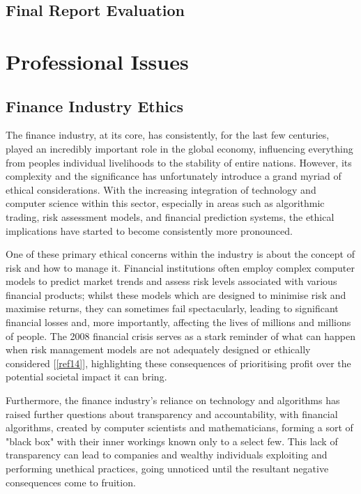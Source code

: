\documentclass{article}
\begin{document}
\subsection{Final Report Evaluation}



\section{Professional Issues}

\subsection{Finance Industry Ethics}

The finance industry, at its core, has consistently, for the last few centuries, played an incredibly important role in the global economy, influencing everything from peoples individual livelihoods to the stability of entire nations. However, its complexity and the significance has unfortunately introduce a grand myriad of ethical considerations. With the increasing integration of technology and computer science within this sector, especially in areas such as algorithmic trading, risk assessment models, and financial prediction systems, the ethical implications have started to become consistently more pronounced.\\\vspace{0.3cm}

One of these primary ethical concerns within the industry is about the concept of risk and how to manage it. Financial institutions often employ complex computer models to predict market trends and assess risk levels associated with various financial products; whilst these models which are designed to minimise risk and maximise returns, they can sometimes fail spectacularly, leading to significant financial losses and, more importantly, affecting the lives of millions and millions of people. The 2008 financial crisis serves as a stark reminder of what can happen when risk management models are not adequately designed or ethically considered [\ref{ref14}], highlighting these consequences of prioritising profit over the potential societal impact it can bring.\\\vspace{0.3cm}

Furthermore, the finance industry's reliance on technology and algorithms has raised further questions about transparency and accountability, with financial algorithms, created by computer scientists and mathematicians, forming a sort of "black box" with their inner workings known only to a select few. This lack of transparency can lead to companies and wealthy individuals exploiting and performing unethical practices, going unnoticed until the resultant negative consequences come to fruition.\\\vspace{0.3cm}
\end{document}

